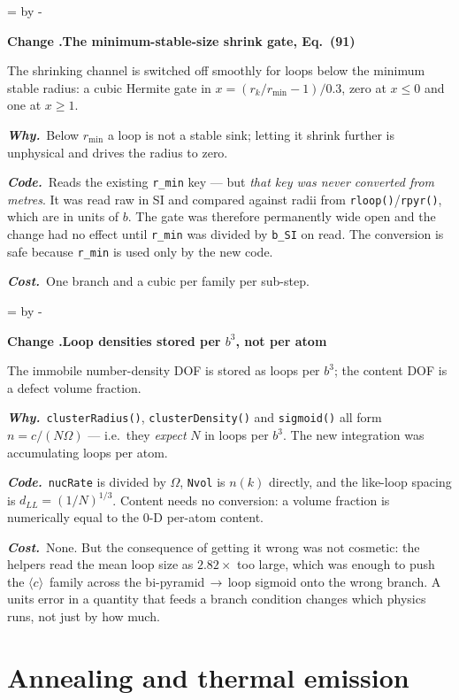 \documentclass[11pt,a4paper]{article}
\newcommand{\code}[1]{\texttt{\small #1}}
\newcommand{\cloop}{\ensuremath{\langle c\rangle}}
\newcommand{\Om}{\ensuremath{\Omega}}
\newcommand{\needlines}[1]{%
  \par\dimen0=\pagegoal \advance\dimen0 by -\pagetotal
  \ifdim\dimen0<#1\baselineskip \newpage \fi}
\newcounter{chg}
\newcommand{\change}[1]{%
  \needlines{4}%
  \refstepcounter{chg}%
  \par\medskip\noindent
  {\bfseries\boldmath Change \thechg.\quad #1}%
  \par\nobreak\smallskip}
\newcommand{\why}[1]{\par\noindent\textbf{\itshape Why.}\ #1\par}
\newcommand{\impact}[1]{\par\noindent\textbf{\itshape Code.}\ #1\par}
\newcommand{\cost}[1]{\par\noindent\textbf{\itshape Cost.}\ #1\par}
\begin{document}
\change{The minimum-stable-size shrink gate, Eq.\ (91)}
\label{chg:gate}
The shrinking channel is switched off smoothly for loops below the minimum
stable radius: a cubic Hermite gate in $x = (r_k/r_{\min}-1)/0.3$, zero at
$x\le0$ and one at $x\ge1$.
\why{Below $r_{\min}$ a loop is not a stable sink; letting it shrink further
is unphysical and drives the radius to zero.}
\impact{Reads the existing \code{r\_min} key --- but \emph{that key was never
converted from metres}. It was read raw in SI and compared against radii from
\code{rloop()}/\code{rpyr()}, which are in units of $b$. The gate was
therefore permanently wide open and the change had no effect until
\code{r\_min} was divided by \code{b\_SI} on read. The conversion is safe
because \code{r\_min} is used only by the new code.}
\cost{One branch and a cubic per family per sub-step.}

\change{Loop densities stored per $b^3$, not per atom}
\label{chg:perb3}
The immobile number-density DOF is stored as loops per $b^3$; the content DOF
is a defect volume fraction.
\why{\code{clusterRadius()}, \code{clusterDensity()} and \code{sigmoid()} all
form $n = c/(N\Om)$ --- i.e.\ they \emph{expect} $N$ in loops per $b^3$. The
new integration was accumulating loops per atom.}
\impact{\code{nucRate} is divided by \Om, \code{Nvol} is $n(k)$ directly, and
the like-loop spacing is $d_{LL} = (1/N)^{1/3}$. Content needs no conversion:
a volume fraction is numerically equal to the 0-D per-atom content.}
\cost{None. But the consequence of getting it wrong was not cosmetic: the
helpers read the mean loop size as $2.82\times$ too large, which was enough to
push the \cloop\ family across the bi-pyramid\,$\rightarrow$\,loop sigmoid onto
the wrong branch. A units error in a quantity that feeds a branch condition
changes which physics runs, not just by how much.}

\section{Annealing and thermal emission}
\end{document}
